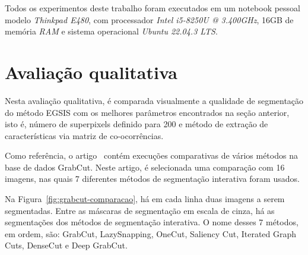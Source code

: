 Todos os experimentos deste trabalho foram executados em um notebook
pessoal modelo \textit{Thinkpad E480}, com processador \textit{Intel i5{-}8250U @
3.400GHz}, 16GB de memória \textit{RAM} e sistema operacional \textit{Ubuntu 22.04.3
LTS}.


\section{Avaliação qualitativa}

Nesta avaliação qualitativa, é comparada visualmente a qualidade
de segmentação do método \gls{EGSIS} com os melhores parâmetros
encontrados na seção anterior, isto é, número de superpixels definido
para 200 e método de extração de características via matriz de
co-ocorrências.

Como referência, o artigo~\cite{wang2023review} contém execuções
comparativas de vários métodos na base de dados GrabCut. Neste artigo,
é selecionada uma comparação com 16 imagens, nas quais 7 diferentes
métodos de segmentação interativa foram usados.

\begin{figure}[h!]
        \captionsetup{width=16cm}
		\centering
\end{figure}
\FloatBarrier{}

Na Figura~\ref{fig:grabcut-comparacao}, há em cada linha duas
imagens a serem segmentadas. Entre as máscaras de segmentação em escala
de cinza, há as segmentações dos métodos de segmentação
interativa. O nome desses 7 métodos, em ordem, são: GrabCut,
LazySnapping, OneCut, Saliency Cut, Iterated Graph Cuts\footnotemark{}, DenseCut e
Deep GrabCut.



